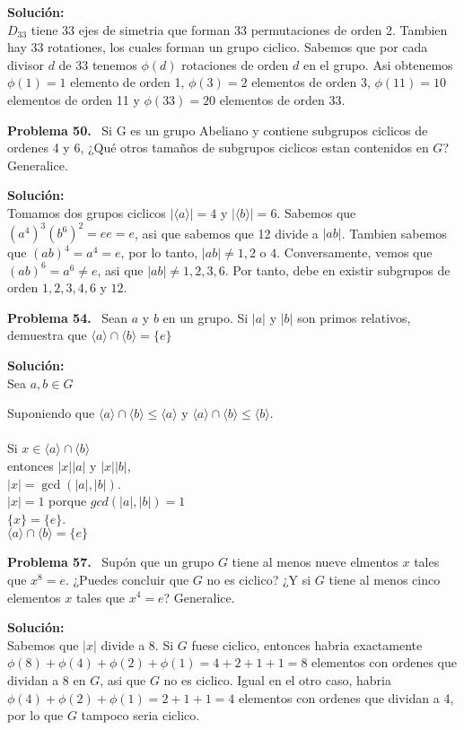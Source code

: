 \documentclass{article}
\newcounter{problem}
\newcounter{solution}
\newcommand\Problem[1]{%
  \stepcounter{problem}%
  \textbf{Problema #1.}~%
  \setcounter{solution}{0}%
}
\newcommand\TheSolution{%
  \textbf{Solución:}\\%
}
\begin{document}
\TheSolution{}
$D_{33}$ tiene 33 ejes de simetria que forman 33 permutaciones de orden 2.
Tambien hay 33 rotationes, los cuales forman un grupo ciclico. Sabemos que
por cada divisor $d$ de 33 tenemos $\phi(d)$ rotaciones de orden $d$ en el
grupo. Asi obtenemos $\phi(1) = 1$ elemento de orden 1, $\phi(3) = 2$
elementos de orden 3, $\phi(11) = 10$ elementos de orden 11 y $\phi(33) =
20$ elementos de orden 33.


\Problem{50} Si G es un grupo Abeliano y contiene subgrupos ciclicos de
ordenes 4 y 6, ¿Qué otros tamaños de subgrupos ciclicos estan contenidos en
$G$? Generalice.

\TheSolution{} Tomamos dos grupos ciclicos $|\langle a \rangle| = 4$ y
$|\langle b\rangle| = 6$. Sabemos que ${(a^4)}^{3}{(b^6)}^2 = ee = e$, asi que
sabemos que 12 divide a $|ab|$. Tambien sabemos que ${(ab)}^{4} = a^4 = e$,
por lo tanto, $|ab| \neq 1, 2$ o $4$. Conversamente, vemos que ${(ab)}^{6} =
a^{6} \neq e$, asi que $|ab| \neq 1, 2, 3, 6$. Por tanto, debe en existir
subgrupos de orden $1, 2, 3, 4, 6$ y $12$.

\Problem{54} Sean $a$ y $b$ en un grupo. Si $|a|$ y $|b|$ son primos
relativos, demuestra que $\langle a \rangle \cap \langle b \rangle = \{e\}$

\TheSolution{}
Sea $a,b \in G$

Suponiendo que $ \langle a \rangle \cap \langle b \rangle  \leq \langle a
\rangle$ y  $ \langle a \rangle \cap \langle b \rangle  \leq \langle b
\rangle$.\\\\
Si $x \in \langle a \rangle \cap \langle b \rangle$\\ entonces $|x| |a|$ y
$|x||b|$,\\
$|x| = \gcd(|a|,|b|)$.\\
$|x| = 1$ porque $gcd(|a|,|b|) = 1$\\
$\{x\} = \{e\}$.\\
$\langle a \rangle \cap \langle b \rangle = \{e\}$

\Problem{57} Supón que un grupo $G$ tiene al menos nueve elmentos $x$ tales
que $x^8 = e$. ¿Puedes concluir que $G$ no es ciclico? ¿Y si $G$ tiene al
menos cinco elementos $x$ tales que $x^4 = e$? Generalice.

\TheSolution{} Sabemos que $|x|$ divide a $8$. Si $G$ fuese ciclico, entonces
habria exactamente $\phi(8) + \phi(4) + \phi(2) + \phi(1) = 4 + 2 + 1 + 1 = 8$
elementos con ordenes que dividan a $8$ en $G$, asi que $G$ no es ciclico.
Igual en el otro caso, habria $\phi(4) + \phi(2) + \phi(1) = 2 + 1 + 1 = 4$
elementos con ordenes que dividan a 4, por lo que $G$ tampoco seria ciclico.
\end{document}
